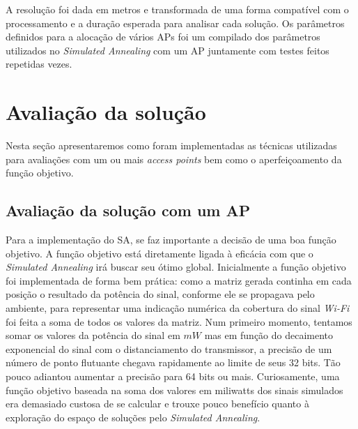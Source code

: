 \documentclass[
	12pt,				%
	twoside,			%
	a4paper,			%
	english,			%
	french,				%
	spanish,			%
	brazil				%
	]{abntex2}
\begin{document}
A resolução foi dada em metros e transformada de uma forma compatível
com o processamento e a duração esperada para analisar cada solução. Os
parâmetros definidos para a alocação de vários APs foi um compilado dos
parâmetros utilizados no \emph{Simulated Annealing} com um AP juntamente
com testes feitos repetidas vezes.

\section{Avaliação da solução}\label{avaliauxe7uxe3o-da-soluuxe7uxe3o}

Nesta seção apresentaremos como foram implementadas as técnicas
utilizadas para avaliações com um ou mais \emph{access points} bem como
o aperfeiçoamento da função objetivo.

\subsection{Avaliação da solução com um AP}\label{sec:avalia_one_ap}

Para a implementação do SA, se faz importante a decisão de uma boa
função objetivo. A função objetivo está diretamente ligada à eficácia
com que o \emph{Simulated Annealing} irá buscar seu ótimo global.
Inicialmente a função objetivo foi implementada de forma bem prática:
como a matriz gerada continha em cada posição o resultado da potência do
sinal, conforme ele se propagava pelo ambiente, para representar uma
indicação numérica da cobertura do sinal \emph{Wi-Fi} foi feita a soma
de todos os valores da matriz. Num primeiro momento, tentamos somar os
valores da potência do sinal em \(mW\) mas em função do decaimento
exponencial do sinal com o distanciamento do transmissor, a precisão de
um número de ponto flutuante chegava rapidamente ao limite de seus 32
bits. Tão pouco adiantou aumentar a precisão para 64 bits ou mais.
Curiosamente, uma função objetivo baseada na soma dos valores em
miliwatts dos sinais simulados era demasiado custosa de se calcular e
trouxe pouco benefício quanto à exploração do espaço de soluções pelo
\emph{Simulated Annealing}.
\end{document}
